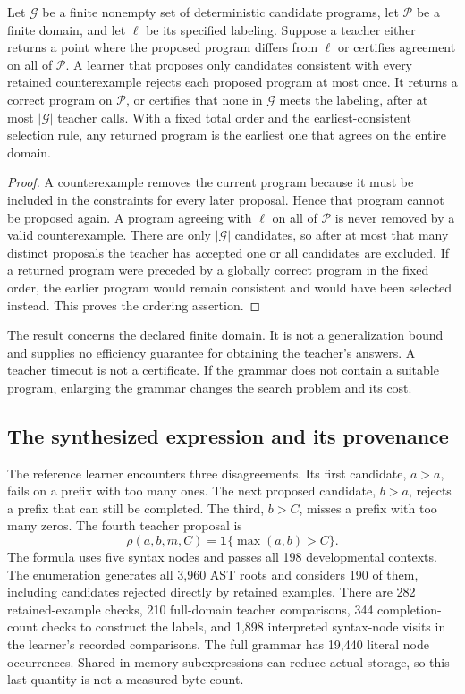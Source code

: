 \begin{SIItheorem}\label{SII:thm:grammar-refinement}
Let $\mathcal G$ be a finite nonempty set of deterministic candidate programs, let $\mathcal P$ be a finite domain, and let $\ell$ be its specified labeling. Suppose a teacher either returns a point where the proposed program differs from $\ell$ or certifies agreement on all of $\mathcal P$. A learner that proposes only candidates consistent with every retained counterexample rejects each proposed program at most once. It returns a correct program on $\mathcal P$, or certifies that none in $\mathcal G$ meets the labeling, after at most $|\mathcal G|$ teacher calls. With a fixed total order and the earliest-consistent selection rule, any returned program is the earliest one that agrees on the entire domain.
\end{SIItheorem}
\begin{proof}
A counterexample removes the current program because it must be included in the constraints for every later proposal. Hence that program cannot be proposed again. A program agreeing with $\ell$ on all of $\mathcal P$ is never removed by a valid counterexample. There are only $|\mathcal G|$ candidates, so after at most that many distinct proposals the teacher has accepted one or all candidates are excluded. If a returned program were preceded by a globally correct program in the fixed order, the earlier program would remain consistent and would have been selected instead. This proves the ordering assertion.
\end{proof}

The result concerns the declared finite domain. It is not a generalization bound and supplies no efficiency guarantee for obtaining the teacher's answers. A teacher timeout is not a certificate. If the grammar does not contain a suitable program, enlarging the grammar changes the search problem and its cost.

\subsection{The synthesized expression and its provenance}
The reference learner encounters three disagreements. Its first candidate, $a>a$, fails on a prefix with too many ones. The next proposed candidate, $b>a$, rejects a prefix that can still be completed. The third, $b>C$, misses a prefix with too many zeros. The fourth teacher proposal is
\begin{equation}\label{SII:eq:learned-prune}
\rho(a,b,m,C)=\mathbf 1\{\max(a,b)>C\}.
\end{equation}
The formula uses five syntax nodes and passes all 198 developmental contexts. The enumeration generates all 3,960 AST roots and considers 190 of them, including candidates rejected directly by retained examples. There are 282 retained-example checks, 210 full-domain teacher comparisons, 344 completion-count checks to construct the labels, and 1,898 interpreted syntax-node visits in the learner's recorded comparisons. The full grammar has 19,440 literal node occurrences. Shared in-memory subexpressions can reduce actual storage, so this last quantity is not a measured byte count.

